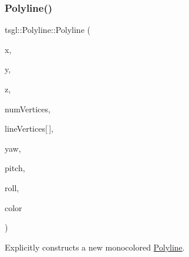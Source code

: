 \subsubsection{\texorpdfstring{Polyline()}{Polyline()}\hspace{0.1cm}{\footnotesize\ttfamily [2/3]}}
{\footnotesize\ttfamily tsgl\+::\+Polyline\+::\+Polyline (\begin{DoxyParamCaption}\item[{float}]{x,  }\item[{float}]{y,  }\item[{float}]{z,  }\item[{int}]{num\+Vertices,  }\item[{float}]{line\+Vertices\mbox{[}$\,$\mbox{]},  }\item[{float}]{yaw,  }\item[{float}]{pitch,  }\item[{float}]{roll,  }\item[{\hyperlink{structtsgl_1_1_color_float}{Color\+Float}}]{color }\end{DoxyParamCaption})}



Explicitly constructs a new monocolored \hyperlink{classtsgl_1_1_polyline}{Polyline}. 

